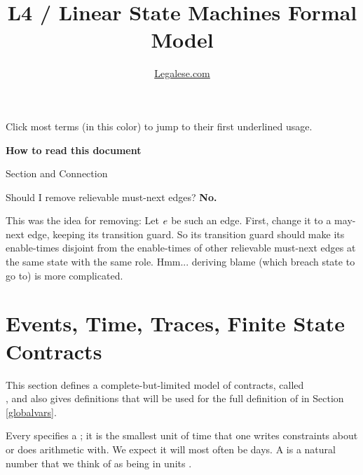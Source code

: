 \documentclass[12pt]{article}
\author{\href{https://legalese.com}{Legalese.com}}
\title{L4 / Linear State Machines Formal Model}
\begin{document}
\maketitle



\noindent Click most terms (in \color{TermColor}this color\color{black}) to jump to their first underlined usage.

\begin{PPI}
\item {\bf How to read this document}
\item Section and Connection

\item Should I remove relievable must-next edges? {\bf No.}

This was the idea for removing: Let $e$ be such an edge. First, change it to a may-next edge, keeping its transition guard. So its transition guard should make its enable-times disjoint from the enable-times of other relievable must-next edges at the same state with the same role. Hmm... deriving blame (which breach state to go to) is more complicated.

\end{PPI}

\tableofcontents



\section{Events, Time, Traces, Finite State Contracts} \label{basics}

This section defines a complete-but-limited model of contracts, called \\ , and also gives definitions that will be used for the full definition of  in Section \ref{globalvars}.

Every \Contract specifies a ; it is the smallest unit of time that one writes constraints about or does arithmetic with. We expect it will most often be days. A  is a natural number that we think of as being in units \TimeUnit.
\end{document}
